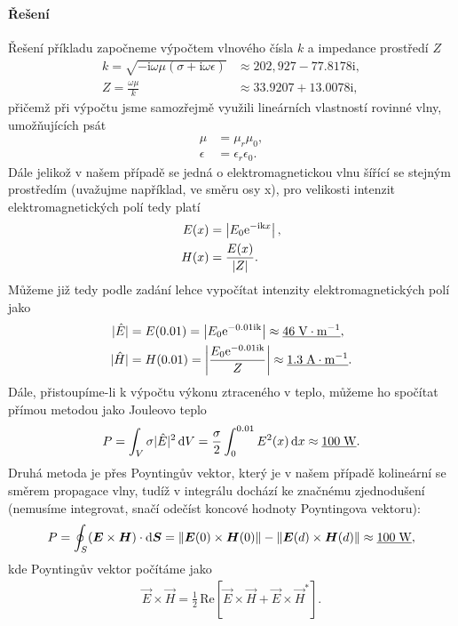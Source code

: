 \documentclass[11pt, a4paper]{article}
\begin{document}
	\paragraph{Řešení}
		Řešení příkladu započneme výpočtem vlnového čísla $k$ a impedance prostředí $Z$
		\begin{align*}
			k = \sqrt{-\mathrm i \omega \mu (\sigma + \mathrm i \omega \epsilon)} &\approx 202,927 -77.8178 \mathrm i,
		\\
			Z = \frac{\omega \mu}{k} &\approx 33.9207 + 13.0078 \mathrm i,
		\end{align*}
		přičemž při výpočtu jsme samozřejmě využili lineárních vlastností rovinné vlny, umožňujících psát
		\begin{align*}
			\mu &= \mu_r \mu_0,
		\\
			\epsilon &= \epsilon_r \epsilon_0.
		\end{align*}
		Dále jelikož v našem případě se jedná o elektromagnetickou vlnu šířící se stejným prostředím (uvažujme například, ve směru osy x), pro velikosti intenzit elektromagnetických polí tedy platí
		\begin{align*}
			E(x) &= \left| E_0 \mathrm e^{-\mathrm{ik}x} \right|,
		\\
			H(x) &= \frac{E(x)}{|Z|}.
		\end{align*}
		Můžeme již tedy podle zadání lehce vypočítat intenzity elektromagnetických polí jako
		\begin{align*}
			|\hat E| &= E(0.01) = \left| E_0 \mathrm e^{-0.01 \mathrm{ik}} \right| \approx \underline{46 \; \mathrm V \cdot \mathrm m^{-1}},
		\\
			|\hat H| &= H(0.01) = \left| \frac{E_0 \mathrm e^{-0.01 \mathrm{ik}}}{Z} \right| \approx \underline{1.3 \; \mathrm A \cdot \mathrm m^{-1}}.
		\end{align*}
		Dále, přistoupíme-li k výpočtu výkonu ztraceného v teplo, můžeme ho spočítat přímou metodou jako Jouleovo teplo
		\begin{align*}
			P = \int_V \sigma |\hat E|^2 \, {\mathrm d} V = \frac \sigma 2 \int_{0}^{0.01} E^2(x) \, {\mathrm d} x \approx \underline{100 \; \mathrm W}.
		\end{align*}
		Druhá metoda je přes Poyntingův vektor, který je v našem případě kolineární se směrem propagace vlny, tudíž v integrálu dochází ke značnému zjednodušení (nemusíme integrovat, snačí odečíst koncové hodnoty Poyntingova vektoru):
		\begin{align*}
			P = \oint_S (\boldsymbol E \times \boldsymbol H) \cdot {\mathrm d} \boldsymbol S = \left\lVert\boldsymbol E(0) \times \boldsymbol H(0)\right\rVert - \left\lVert\boldsymbol E(d) \times \boldsymbol H(d)\right\rVert \approx \underline{100 \; \mathrm W},
		\end{align*}
		kde Poyntingův vektor počítáme jako
		\begin{align*}
			\vec E \times \vec H = \frac 12 \, \mathrm{Re} \left[ \vec E \times \vec H + \vec E \times \vec H^* \right].
		\end{align*}
	
\end{document}
